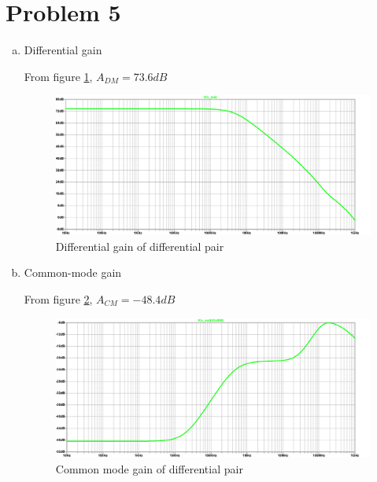 \documentclass{article}
\begin{document}
\section{Problem 5}
\label{sec:org8862ed4}
\begin{enumerate}[(a)]
\item Differential gain

From figure \ref{fig:dm-q5}, \(A_{DM} = 73.6 dB\)
\begin{figure}[H]
\centering
\includegraphics[width=.9\linewidth]{img/q5/dm.pdf}
\caption{\label{fig:dm-q5}Differential gain of differential pair}
\end{figure}
\item Common-mode gain

From figure \ref{fig:cm-q5}, \(A_{CM} = -48.4 dB\)
\begin{figure}[H]
\centering
\includegraphics[width=.9\linewidth]{img/q5/cm.pdf}
\caption{\label{fig:cm-q5}Common mode gain of differential pair}
\end{figure}
\end{enumerate}
\end{document}

